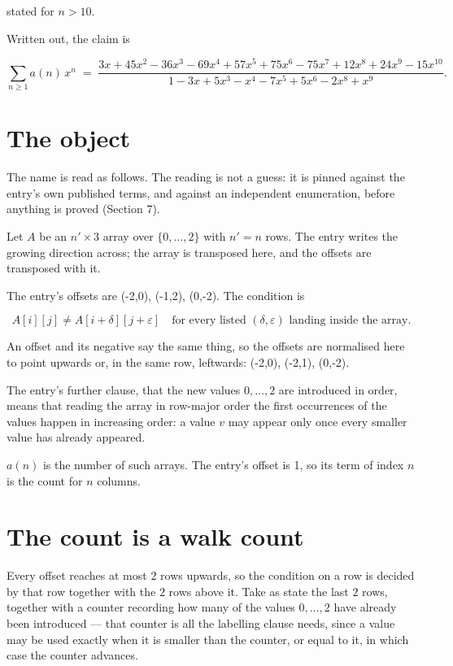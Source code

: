 \documentclass[11pt]{article}
\theoremstyle{definition}
\begin{document}
stated for $n > 10$.

Written out, the claim is

\[\sum_{n \ge 1} a(n)\,x^n \;=\; \frac{3x + 45x^{2} - 36x^{3} - 69x^{4} + 57x^{5} + 75x^{6} - 75x^{7} + 12x^{8} + 24x^{9} - 15x^{10}}{1 - 3x + 5x^{3} - x^{4} - 7x^{5} + 5x^{6} - 2x^{8} + x^{9}}.\]

\section{The object}

The name is read as follows. The reading is not a guess: it is pinned against the entry's own published terms, and against an independent enumeration, before anything is proved (Section 7).

Let $A$ be an $n' \times 3$ array over $\{0,\dots,2\}$ with $n' = n$ rows. The entry writes the growing direction across; the array is transposed here, and the offsets are transposed with it.

The entry's offsets are (-2,0), (-1,2), (0,-2). The condition is

\[A[i][j] \ne A[i{+}\delta][j{+}\varepsilon]\quad\text{for every listed }(\delta,\varepsilon)\text{ landing inside the array.}\]

An offset and its negative say the same thing, so the offsets are normalised here to point upwards or, in the same row, leftwards: (-2,0), (-2,1), (0,-2).

The entry's further clause, that the new values $0,\dots,2$ are introduced in order, means that reading the array in row-major order the first occurrences of the values happen in increasing order: a value $v$ may appear only once every smaller value has already appeared.

$a(n)$ is the number of such arrays. The entry's offset is 1, so its term of index $n$ is the count for $n$ columns.

\section{The count is a walk count}

Every offset reaches at most $2$ rows upwards, so the condition on a row is decided by that row together with the $2$ rows above it. Take as state the last $2$ rows, together with a counter recording how many of the values $0,\dots,2$ have already been introduced --- that counter is all the labelling clause needs, since a value may be used exactly when it is smaller than the counter, or equal to it, in which case the counter advances.
\end{document}
